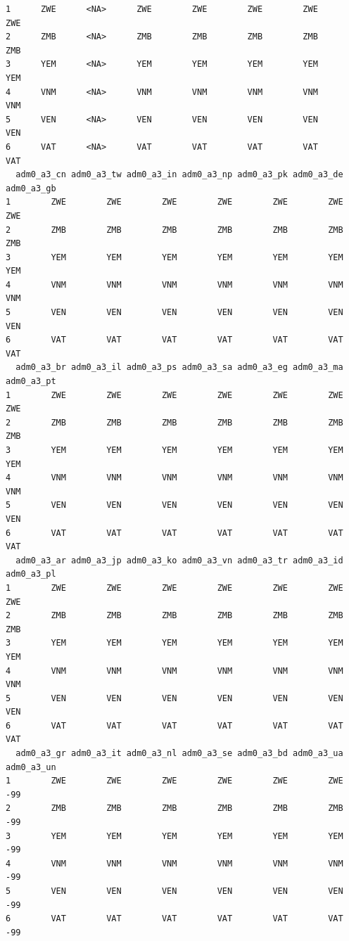 \documentclass[
  letterpaper,
  DIV=11,
  numbers=noendperiod,
  oneside]{scrreprt}
\begin{document}
\begin{verbatim}
1      ZWE      <NA>      ZWE        ZWE        ZWE        ZWE        ZWE
2      ZMB      <NA>      ZMB        ZMB        ZMB        ZMB        ZMB
3      YEM      <NA>      YEM        YEM        YEM        YEM        YEM
4      VNM      <NA>      VNM        VNM        VNM        VNM        VNM
5      VEN      <NA>      VEN        VEN        VEN        VEN        VEN
6      VAT      <NA>      VAT        VAT        VAT        VAT        VAT
  adm0_a3_cn adm0_a3_tw adm0_a3_in adm0_a3_np adm0_a3_pk adm0_a3_de adm0_a3_gb
1        ZWE        ZWE        ZWE        ZWE        ZWE        ZWE        ZWE
2        ZMB        ZMB        ZMB        ZMB        ZMB        ZMB        ZMB
3        YEM        YEM        YEM        YEM        YEM        YEM        YEM
4        VNM        VNM        VNM        VNM        VNM        VNM        VNM
5        VEN        VEN        VEN        VEN        VEN        VEN        VEN
6        VAT        VAT        VAT        VAT        VAT        VAT        VAT
  adm0_a3_br adm0_a3_il adm0_a3_ps adm0_a3_sa adm0_a3_eg adm0_a3_ma adm0_a3_pt
1        ZWE        ZWE        ZWE        ZWE        ZWE        ZWE        ZWE
2        ZMB        ZMB        ZMB        ZMB        ZMB        ZMB        ZMB
3        YEM        YEM        YEM        YEM        YEM        YEM        YEM
4        VNM        VNM        VNM        VNM        VNM        VNM        VNM
5        VEN        VEN        VEN        VEN        VEN        VEN        VEN
6        VAT        VAT        VAT        VAT        VAT        VAT        VAT
  adm0_a3_ar adm0_a3_jp adm0_a3_ko adm0_a3_vn adm0_a3_tr adm0_a3_id adm0_a3_pl
1        ZWE        ZWE        ZWE        ZWE        ZWE        ZWE        ZWE
2        ZMB        ZMB        ZMB        ZMB        ZMB        ZMB        ZMB
3        YEM        YEM        YEM        YEM        YEM        YEM        YEM
4        VNM        VNM        VNM        VNM        VNM        VNM        VNM
5        VEN        VEN        VEN        VEN        VEN        VEN        VEN
6        VAT        VAT        VAT        VAT        VAT        VAT        VAT
  adm0_a3_gr adm0_a3_it adm0_a3_nl adm0_a3_se adm0_a3_bd adm0_a3_ua adm0_a3_un
1        ZWE        ZWE        ZWE        ZWE        ZWE        ZWE        -99
2        ZMB        ZMB        ZMB        ZMB        ZMB        ZMB        -99
3        YEM        YEM        YEM        YEM        YEM        YEM        -99
4        VNM        VNM        VNM        VNM        VNM        VNM        -99
5        VEN        VEN        VEN        VEN        VEN        VEN        -99
6        VAT        VAT        VAT        VAT        VAT        VAT        -99

\end{verbatim}
\end{document}
